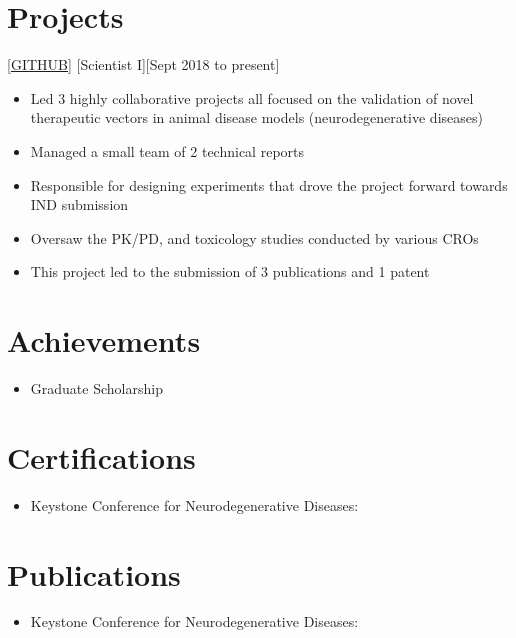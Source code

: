 \documentclass{article}
\begin{document}
    \section{Projects}

    [\href{https://github.com/Mayank0255}{GITHUB}]
    [Scientist I][Sept 2018 to present]

    \begin{itemize}
        \item Led 3 highly collaborative projects all focused on the validation of novel therapeutic vectors in animal disease models (neurodegenerative diseases)
        \item Managed a small team of 2 technical reports
        \item Responsible for designing experiments that drove the project forward towards IND submission
        \item Oversaw the PK/PD, and toxicology studies conducted by various CROs
        \item This project led to the submission of 3 publications and 1 patent
    \end{itemize}

    \section{Achievements}
    \begin{itemize}
        \item Graduate Scholarship
    \end{itemize}

    \section{Certifications}

    \begin{itemize}
        \item Keystone Conference for Neurodegenerative Diseases:
    \end{itemize}


    \section{Publications}

    \begin{itemize}
        \item Keystone Conference for Neurodegenerative Diseases:
    \end{itemize}
\end{document}
